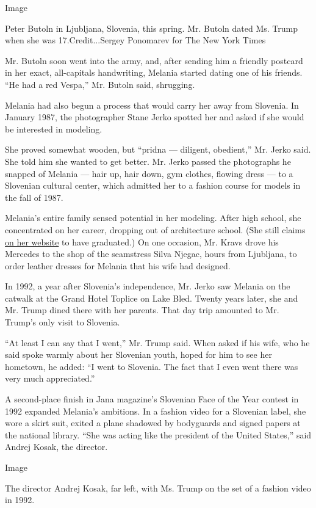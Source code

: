 Image

Peter Butoln in Ljubljana, Slovenia, this spring. Mr. Butoln dated Ms.
Trump when she was 17.Credit...Sergey Ponomarev for The New York Times

Mr. Butoln soon went into the army, and, after sending him a friendly
postcard in her exact, all-capitals handwriting, Melania started dating
one of his friends. ``He had a red Vespa,'' Mr. Butoln said, shrugging.

Melania had also begun a process that would carry her away from
Slovenia. In January 1987, the photographer Stane Jerko spotted her and
asked if she would be interested in modeling.

She proved somewhat wooden, but ``pridna --- diligent, obedient,'' Mr.
Jerko said. She told him she wanted to get better. Mr. Jerko passed the
photographs he snapped of Melania --- hair up, hair down, gym clothes,
flowing dress --- to a Slovenian cultural center, which admitted her to
a fashion course for models in the fall of 1987.

Melania's entire family sensed potential in her modeling. After high
school, she concentrated on her career, dropping out of architecture
school. (She still claims
\href{http://www.melaniatrump.com/my-world/}{on her website} to have
graduated.) On one occasion, Mr. Kravs drove his Mercedes to the shop of
the seamstress Silva Njegac, hours from Ljubljana, to order leather
dresses for Melania that his wife had designed.

In 1992, a year after Slovenia's independence, Mr. Jerko saw Melania on
the catwalk at the Grand Hotel Toplice on Lake Bled. Twenty years later,
she and Mr. Trump dined there with her parents. That day trip amounted
to Mr. Trump's only visit to Slovenia.

``At least I can say that I went,'' Mr. Trump said. When asked if his
wife, who he said spoke warmly about her Slovenian youth, hoped for him
to see her hometown, he added: ``I went to Slovenia. The fact that I
even went there was very much appreciated.''

A second-place finish in Jana magazine's Slovenian Face of the Year
contest in 1992 expanded Melania's ambitions. In a fashion video for a
Slovenian label, she wore a skirt suit, exited a plane shadowed by
bodyguards and signed papers at the national library. ``She was acting
like the president of the United States,'' said Andrej Kosak, the
director.

Image

The director Andrej Kosak, far left, with Ms. Trump on the set of a
fashion video in 1992.

